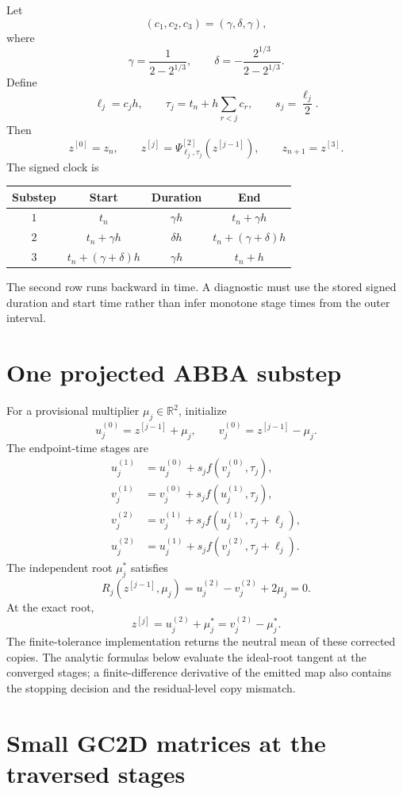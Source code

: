 \documentclass[11pt,a4paper]{article}
\newcommand{\R}{\mathbb{R}}
\begin{document}
Let
\[
 (c_1,c_2,c_3)=(\gamma,\delta,\gamma),
\]
where
\[
 \gamma=\frac{1}{2-2^{1/3}},
 \qquad
 \delta=-\frac{2^{1/3}}{2-2^{1/3}}.
\]
Define
\[
 \ell_j=c_jh,
 \qquad
 \tau_j=t_n+h\sum_{r<j}c_r,
 \qquad
 s_j=\frac{\ell_j}{2}.
\]
Then
\[
 z^{[0]}=z_n,
 \qquad
 z^{[j]}=\Psi^{[2]}_{\ell_j,\tau_j}(z^{[j-1]}),
 \qquad
 z_{n+1}=z^{[3]}.
\]
The signed clock is
\begin{center}
\begin{tabular}{@{}cccc@{}}
\toprule
Substep & Start & Duration & End\\
\midrule
$1$ & $t_n$ & $\gamma h$ & $t_n+\gamma h$\\
$2$ & $t_n+\gamma h$ & $\delta h$ & $t_n+(\gamma+\delta)h$\\
$3$ & $t_n+(\gamma+\delta)h$ & $\gamma h$ & $t_n+h$\\
\bottomrule
\end{tabular}
\end{center}
The second row runs backward in time.  A diagnostic must use the stored signed
duration and start time rather than infer monotone stage times from the outer
interval.

\section{One projected ABBA substep}

For a provisional multiplier $\mu_j\in\R^2$, initialize
\[
 u_j^{(0)}=z^{[j-1]}+\mu_j,
 \qquad
 v_j^{(0)}=z^{[j-1]}-\mu_j.
\]
The endpoint-time stages are
\begin{align*}
 u_j^{(1)}&=u_j^{(0)}+s_jf(v_j^{(0)},\tau_j),\\
 v_j^{(1)}&=v_j^{(0)}+s_jf(u_j^{(1)},\tau_j),\\
 v_j^{(2)}&=v_j^{(1)}+s_jf(u_j^{(1)},\tau_j+\ell_j),\\
 u_j^{(2)}&=u_j^{(1)}+s_jf(v_j^{(2)},\tau_j+\ell_j).
\end{align*}
The independent root $\mu_j^*$ satisfies
\[
 \boxed{
 R_j(z^{[j-1]},\mu_j)
 =u_j^{(2)}-v_j^{(2)}+2\mu_j=0.
 }
\]
At the exact root,
\[
 z^{[j]}=u_j^{(2)}+\mu_j^*=v_j^{(2)}-\mu_j^*.
\]
The finite-tolerance implementation returns the neutral mean of these corrected
copies.  The analytic formulas below evaluate the ideal-root tangent at the
converged stages; a finite-difference derivative of the emitted map also
contains the stopping decision and the residual-level copy mismatch.

\section{Small GC2D matrices at the traversed stages}
\end{document}
